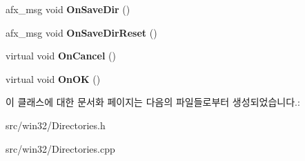 \begin{DoxyCompactItemize}
\item 
\mbox{\label{class_directories_a0951489dd35ed7af5fb7ea27c95fbe8e}} 
afx\+\_\+msg void {\bfseries On\+Save\+Dir} ()
\item 
\mbox{\label{class_directories_aeb85866cbd498c057e9bf66b58a78959}} 
afx\+\_\+msg void {\bfseries On\+Save\+Dir\+Reset} ()
\item 
\mbox{\label{class_directories_a139df4e3666356c21c7e5f02ae268193}} 
virtual void {\bfseries On\+Cancel} ()
\item 
\mbox{\label{class_directories_aabe175a096e8718818d7bca6bd6cd455}} 
virtual void {\bfseries On\+OK} ()
\end{DoxyCompactItemize}


이 클래스에 대한 문서화 페이지는 다음의 파일들로부터 생성되었습니다.\+:\begin{DoxyCompactItemize}
\item 
src/win32/Directories.\+h\item 
src/win32/Directories.\+cpp\end{DoxyCompactItemize}
